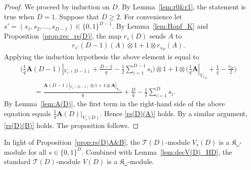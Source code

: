 \documentclass[10pt,a4paper]{amsart}
\def\A{\mathbf A}
\def\K{\mathfrak K_\omega}
\def\T{\mathcal T}
\numberwithin{equation}{section}
\begin{document}
\begin{proof}
We proceed by induction on $D$. By Lemma~\ref{lem:r0&r1}, the statement is true when $D=1$. Suppose that $D\geq 2$.
For convenience let $s'=(s_1,s_2,\dots,s_{D-1})\in \{0,1\}^{D-1}$.
By Lemma~\ref{lem:Hopf_K} and Proposition~\ref{prop:rec_rs(D)}, the map $r_s(D)$ sends $A$ to
\begin{gather*}
r_{s'}(D-1)(A)\otimes 1+1\otimes r_{s_D}(A).
\end{gather*}
Applying the induction hypothesis the above element is equal to
\begin{gather*}
\bigg(\frac{1}{q}\A(D-1)|_{V_{s'}(D-1)}+\frac{D-1}{q}-\frac{1}{2}\sum_{i=1}^{D-1} s_i\bigg)
\otimes 1+1\otimes\bigg(\frac{1}{q}\A|_{V_{s_D}}+\frac{1}{q}-\frac{s_D}{2}\bigg)
\\ \qquad
{}=\frac{\A(D-1)|_{V_{s'}(D-1)}\otimes 1+
1\otimes \A|_{V_{s_D}}}{q}+\frac{D}{q}-\frac{1}{2}\sum_{i=1}^D s_i.
\end{gather*}
By Lemma~\ref{lem:A(D)}, the first term in the right-hand side of the above equation equals $\frac{1}{q} \A(D)|_{V_s(D)}$. Hence \eqref{rs(D)(A)} holds.
By a similar argument, \eqref{rs(D)(B)} holds.
The proposition follows.
\end{proof}

In light of Proposition~\ref{prop:rs(D)A&B}, the $\T(D)$-module $V_s(D)$ is a $\K$-module for all $s\in \{0,1\}^D$. Combined with Lemma~\ref{lem:decV(D)_HD}, the standard $\T(D)$-module $V(D)$ is a $\K$-module.
\end{document}
